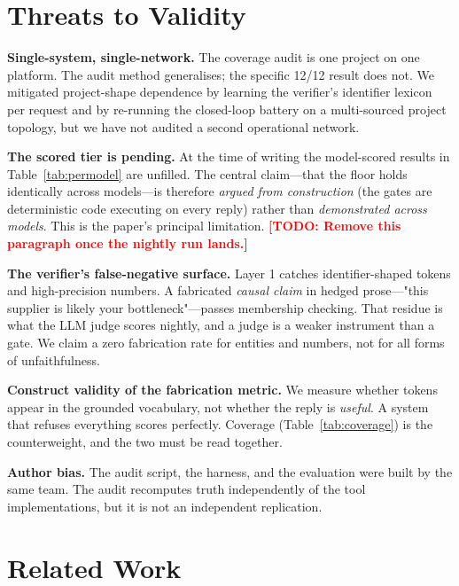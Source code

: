 \documentclass[conference]{IEEEtran}
\newcommand{\TODO}[1]{\textcolor{red}{\textbf{[TODO: #1]}}}
\begin{document}
\section{Threats to Validity}
\label{sec:threats}

\textbf{Single-system, single-network.} The coverage audit is one project on one
platform. The audit method generalises; the specific 12/12 result does not. We
mitigated project-shape dependence by learning the verifier's identifier lexicon
per request and by re-running the closed-loop battery on a multi-sourced project
topology, but we have not audited a second operational network.

\textbf{The scored tier is pending.} At the time of writing the model-scored
results in Table~\ref{tab:permodel} are unfilled. The central claim---that the
floor holds identically across models---is therefore \emph{argued from
construction} (the gates are deterministic code executing on every reply) rather
than \emph{demonstrated across models}. This is the paper's principal
limitation. \TODO{Remove this paragraph once the nightly run lands.}

\textbf{The verifier's false-negative surface.} Layer 1 catches
identifier-shaped tokens and high-precision numbers. A fabricated \emph{causal
claim} in hedged prose---"this supplier is likely your bottleneck"---passes
membership checking. That residue is what the LLM judge scores nightly, and a
judge is a weaker instrument than a gate. We claim a zero fabrication rate for
entities and numbers, not for all forms of unfaithfulness.

\textbf{Construct validity of the fabrication metric.} We measure whether tokens
appear in the grounded vocabulary, not whether the reply is \emph{useful}. A
system that refuses everything scores perfectly. Coverage (Table~\ref{tab:coverage})
is the counterweight, and the two must be read together.

\textbf{Author bias.} The audit script, the harness, and the evaluation were built
by the same team. The audit recomputes truth independently of the tool
implementations, but it is not an independent replication.

\section{Related Work}
\label{sec:related}
\end{document}
